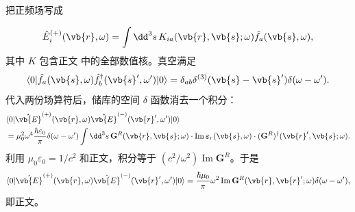 \begin{derivation}[储库真空态中的电场关联]
把正频场写成

\begin{equation*}
\hat E_i^{(+)}(\vb{r},\omega)
=\int\dd^3 s\,K_{ia}(\vb{r},\vb{s};\omega)
\hat f_a(\vb{s},\omega),
\end{equation*}
其中 \(K\) 包含正文 中的全部数值核。真空满足
\begin{equation*}
\langle0|\hat f_a(\vb{s},\omega)
\hat f_b^\dagger(\vb{s}',\omega')|0\rangle
=\delta_{ab}\delta^{(3)}(\vb{s}-\vb{s}')\delta(\omega-\omega').
\end{equation*}
代入两份场算符后，储库的空间 \(\delta\) 函数消去一个积分：
\begin{align*}
&\langle0|\hat{\vb{E}}^{(+)}(\vb{r},\omega)
\hat{\vb{E}}^{(-)}(\vb{r}',\omega')|0\rangle\\
&=\mu_0^2\omega^4\frac{\hbar\varepsilon_0}{\pi}
\delta(\omega-\omega')
\int\dd^3 s\,
\mathbf G^R(\vb{r},\vb{s};\omega)
\cdot\operatorname{Im}\boldsymbol\varepsilon_r(\vb{s},\omega)
\cdot(\mathbf G^R)^\dagger(\vb{r}',\vb{s};\omega).
\end{align*}
利用 \(\mu_0\varepsilon_0=1/c^2\) 和正文，积分等于 \((c^2/\omega^2)\operatorname{Im}\mathbf G^R\)。于是
\begin{equation*}
\langle0|\hat{\vb{E}}^{(+)}(\vb{r},\omega)
\hat{\vb{E}}^{(-)}(\vb{r}',\omega')|0\rangle
=\frac{\hbar\mu_0}{\pi}\omega^2
\operatorname{Im}\mathbf G^R(\vb{r},\vb{r}';\omega)
\delta(\omega-\omega'),
\end{equation*}
即正文。
\end{derivation}

